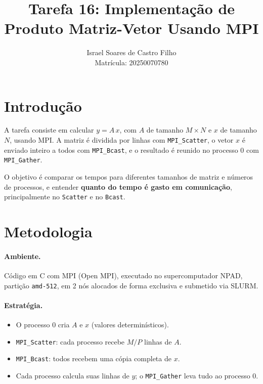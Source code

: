 \documentclass[a4paper,12pt]{article}
\title{Tarefa 16: Implementação de Produto Matriz-Vetor Usando MPI}
\author{Israel Soares de Castro Filho \\ Matrícula: 20250070780}
\date{}
\begin{document}
\maketitle

\section{Introdução}

A tarefa consiste em calcular $y = A\,x$, com $A$ de tamanho $M \times N$ e $x$ de tamanho $N$, usando MPI. A matriz é dividida por linhas com \texttt{MPI\_Scatter}, o vetor $x$ é enviado inteiro a todos com \texttt{MPI\_Bcast}, e o resultado é reunido no processo 0 com \texttt{MPI\_Gather}.

O objetivo é comparar os tempos para diferentes tamanhos de matriz e números de processos, e entender \textbf{quanto do tempo é gasto em comunicação}, principalmente no \texttt{Scatter} e no \texttt{Bcast}.

\section{Metodologia}

\paragraph{Ambiente.} Código em C com MPI (Open MPI), executado no supercomputador NPAD, partição \texttt{amd-512}, em 2 nós alocados de forma exclusiva e submetido via SLURM.

\paragraph{Estratégia.}
\begin{itemize}
    \item O processo 0 cria $A$ e $x$ (valores determinísticos).
    \item \texttt{MPI\_Scatter}: cada processo recebe $M/P$ linhas de $A$.
    \item \texttt{MPI\_Bcast}: todos recebem uma cópia completa de $x$.
    \item Cada processo calcula suas linhas de $y$; o \texttt{MPI\_Gather} leva tudo ao processo 0.
\end{itemize}
\end{document}
